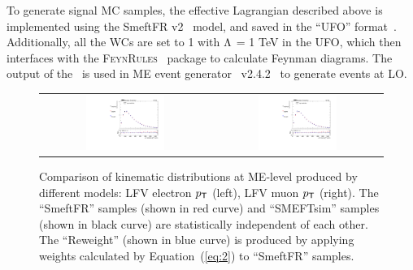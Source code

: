 To generate signal \ac{MC} samples, the effective Lagrangian described above is implemented using the SmeftFR v2~\cite{Dedes:2019uzs} model, and saved in the ``UFO'' format~\cite{Degrande:2011ua}. Additionally, all the \acp{WC} are set to 1 with $\mathrm{\Lambda}$ = 1 TeV in the UFO, which then interfaces with the \textsc{FeynRules}~\cite{Christensen:2008py} package to calculate Feynman diagrams. The output of the \FR~is used in \ac{ME} event generator \MG~v2.4.2~\cite{Alwall:2014hca} to generate events at \ac{LO}. 

\begin{figure}[tbh!]
 \begin{center}
 \begin{tabular}{cc}
 \includegraphics[width=0.48\textwidth]{figures/Part3/Samples/LFVePt}&
 \includegraphics[width=0.48\textwidth]{figures/Part3/Samples/LFVmuPt}\\
 \end{tabular}
 \caption{Comparison of kinematic distributions at \ac{ME}-level produced by different models: LFV electron $p_{\textsf{T}}$ (left), LFV muon $p_{\textsf{T}}$ (right). The ``SmeftFR'' samples (shown in red curve) and ``SMEFTsim'' samples (shown in black curve) are statistically independent of each other. The ``Reweight'' (shown in blue curve) is produced by applying weights calculated by Equation~(\ref{eq:2}) to ``SmeftFR'' samples.}
 \label{fig:reweight}
 \end{center}
\end{figure}


